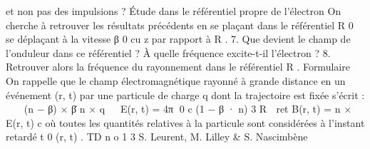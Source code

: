 et non pas des impulsions ?
Étude dans le référentiel propre de l'électron
On cherche à retrouver les résultats précédents en se plaçant dans le référentiel R 0 se déplaçant
à la vitesse β 0 cu z par rapport à R .
7. Que devient le champ de l'onduleur dans ce référentiel ? À quelle fréquence excite-t-il
l'électron ?
8. Retrouver alors la fréquence du rayonnement dans le référentiel R .
Formulaire
On rappelle que le champ électromagnétique rayonné à grande distance en un événement (r, t)
par une particule de charge q dont la trajectoire est fixée s'écrit :

 
(n
−
β)
×
β̇
n
×
q 

E(r, t) =
4π 0 c
(1 − β · n) 3 R

ret
B(r, t) =
n × E(r, t)
c
où toutes les quantités relatives à la particule sont considérées à l'instant retardé t 0 (r, t) .
TD n o 1
3
S. Leurent, M. Lilley & S. Nascimbène
